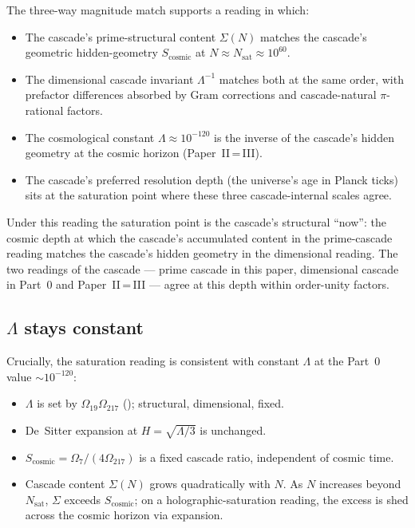 \documentclass[11pt,a4paper]{article}
\begin{document}
The three-way magnitude match supports a reading in which:
\begin{itemize}
\item The cascade's prime-structural content $\Sigma(N)$ matches the
cascade's geometric hidden-geometry $S_{\mathrm{cosmic}}$ at
$N \approx N_{\mathrm{sat}} \approx 10^{60}$.
\item The dimensional cascade invariant $\Lambda^{-1}$ matches both
at the same order, with prefactor differences absorbed by Gram
corrections and cascade-natural $\pi$-rational factors.
\item The cosmological constant $\Lambda \approx 10^{-120}$ is the
inverse of the cascade's hidden geometry at the cosmic horizon
(Paper~II\,=\,III).
\item The cascade's preferred resolution depth (the universe's age
in Planck ticks) sits at the saturation point where these three
cascade-internal scales agree.
\end{itemize}

Under this reading the saturation point is the cascade's structural
``now'': the cosmic depth at which the cascade's accumulated content
in the prime-cascade reading matches the cascade's hidden geometry
in the dimensional reading. The two readings of the cascade --- prime
cascade in this paper, dimensional cascade in Part~0 and
Paper~II\,=\,III --- agree at this depth within order-unity factors.

\subsection*{$\Lambda$ stays constant}

Crucially, the saturation reading is consistent with constant
$\Lambda$ at the Part~0 value $\sim 10^{-120}$:
\begin{itemize}
\item $\Lambda$ is set by $\Omega_{19} \Omega_{217}$
(); structural, dimensional, fixed.
\item De~Sitter expansion at $H = \sqrt{\Lambda/3}$ is unchanged.
\item $S_{\mathrm{cosmic}} = \Omega_7/(4\Omega_{217})$ is a fixed
cascade ratio, independent of cosmic time.
\item Cascade content $\Sigma(N)$ grows quadratically with $N$. As
$N$ increases beyond $N_{\mathrm{sat}}$, $\Sigma$ exceeds
$S_{\mathrm{cosmic}}$; on a holographic-saturation reading, the
excess is shed across the cosmic horizon via expansion.
\end{itemize}
\end{document}
